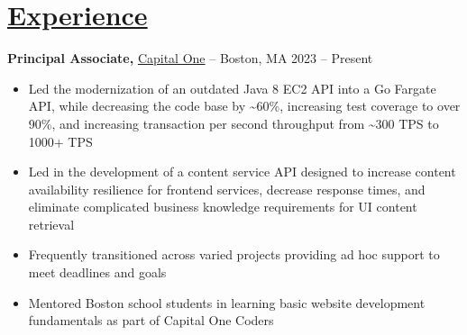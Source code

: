 \documentclass[10pt,letterpaper]{article}
\begin{document}
\section*{\href{https://www.reddit.com/r/EngineeringResumes/wiki/index\#wiki_work_experience}{Experience}}
\textbf{Principal Associate,} \href{https://www.fstl1992.com/}{Capital One} -- Boston, MA \hfill 2023 -- Present \\
\vspace{-9pt}
\begin{itemize}
  \item Led the modernization of an outdated Java 8 EC2 API into a Go Fargate API, while decreasing the code base by \textasciitilde{}60\%, increasing test coverage to over 90\%, and increasing transaction per second throughput from \textasciitilde{}300 TPS to 1000+ TPS
  \item Led in the development of a content service API designed to increase content availability resilience for frontend services, decrease response times, and eliminate complicated business knowledge requirements for UI content retrieval
  \item Frequently transitioned across varied projects providing ad hoc support to meet deadlines and goals
  \item Mentored Boston school students in learning basic website development fundamentals as part of Capital One Coders
\end{itemize}
\end{document}
